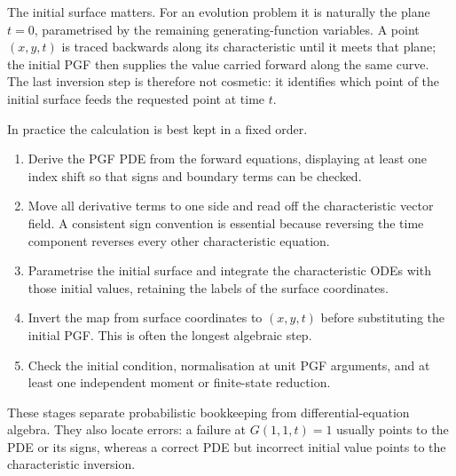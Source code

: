 The initial surface matters.  For an evolution problem it is naturally the plane
$t=0$, parametrised by the remaining generating-function variables.  A point
$(x,y,t)$ is traced backwards along its characteristic until it meets that plane;
the initial PGF then supplies the value carried forward along the same curve.  The
last inversion step is therefore not cosmetic: it identifies which point of the
initial surface feeds the requested point at time $t$.

In practice the calculation is best kept in a fixed order.
\begin{enumerate}[label=\arabic*., leftmargin=2em]
  \item Derive the PGF PDE from the forward equations, displaying at least one
  index shift so that signs and boundary terms can be checked.
  \item Move all derivative terms to one side and read off the characteristic
  vector field.  A consistent sign convention is essential because reversing the
  time component reverses every other characteristic equation.
  \item Parametrise the initial surface and integrate the characteristic ODEs
  with those initial values, retaining the labels of the surface coordinates.
  \item Invert the map from surface coordinates to $(x,y,t)$ before substituting
  the initial PGF.  This is often the longest algebraic step.
  \item Check the initial condition, normalisation at unit PGF arguments, and at
  least one independent moment or finite-state reduction.
\end{enumerate}
These stages separate probabilistic bookkeeping from differential-equation
algebra.  They also locate errors: a failure at $G(1,1,t)=1$ usually points to the
PDE or its signs, whereas a correct PDE but incorrect initial value points to the
characteristic inversion.

